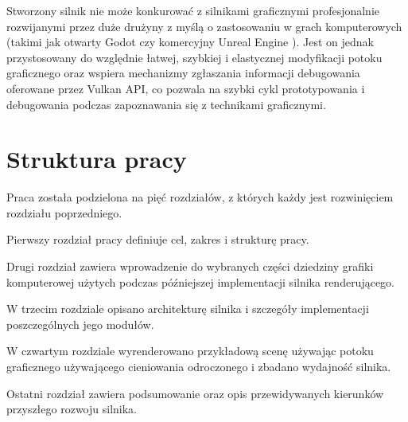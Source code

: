 Stworzony silnik nie może konkurować z silnikami graficznymi profesjonalnie rozwijanymi przez duże drużyny z myślą o zastosowaniu w grach komputerowych (takimi jak otwarty Godot \cite{godotengine} czy komercyjny Unreal Engine \cite{unrealengine}).
Jest on jednak przystosowany do względnie łatwej, szybkiej i elastycznej modyfikacji potoku graficznego oraz wspiera mechanizmy zgłaszania informacji debugowania oferowane przez Vulkan API, co pozwala na szybki cykl prototypowania i debugowania podczas zapoznawania się z technikami graficznymi.

\section{Struktura pracy}


Praca została podzielona na pięć rozdziałów, z których każdy jest rozwinięciem rozdziału poprzedniego.

Pierwszy rozdział pracy definiuje cel, zakres i strukturę pracy.

Drugi rozdział zawiera wprowadzenie do wybranych części dziedziny grafiki komputerowej użytych podczas późniejszej implementacji silnika renderującego.

W trzecim rozdziale opisano architekturę silnika i szczegóły implementacji poszczególnych jego modułów.

W czwartym rozdziale wyrenderowano przykładową scenę używając potoku graficznego używającego cieniowania odroczonego  i zbadano wydajność silnika.

Ostatni rozdział zawiera podsumowanie oraz opis przewidywanych kierunków przyszłego rozwoju silnika.




